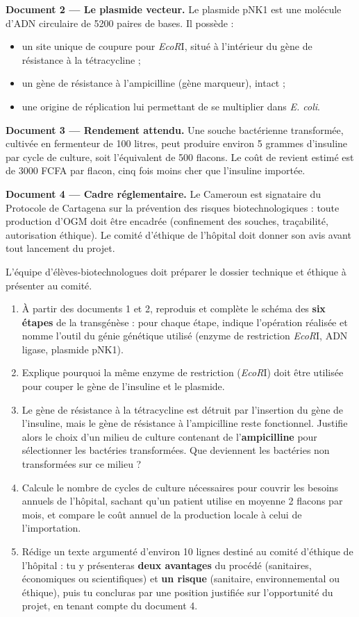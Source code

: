 \documentclass[11pt]{article}
\newcommand{\cle}[1]{{\popxbold\color{popdark}#1}}
\newcounter{popsec}
\newcounter{popsub}
\newcommand{\courssub}[1]{%
  \stepcounter{popsub}%
  \par\vspace{9pt}\noindent{\popxbold\fontsize{11.5}{13}\selectfont\color{popink}{\color{poporange}\thepopsec.\thepopsub}\hspace{6pt}#1}\par\nopagebreak\vspace{4pt}
}
\begin{document}
\textbf{Document 2 — Le plasmide vecteur.} Le plasmide pNK1 est une molécule d'ADN circulaire de 5200 paires de bases. Il possède :
\begin{itemize}
\item un \cle{site unique} de coupure pour \emph{EcoR}I, situé à l'intérieur du gène de résistance à la tétracycline ;
\item un gène de résistance à l'ampicilline (gène \cle{marqueur}), intact ;
\item une origine de réplication lui permettant de se multiplier dans \emph{E. coli}.
\end{itemize}

\textbf{Document 3 — Rendement attendu.} Une souche bactérienne transformée, cultivée en fermenteur de 100 litres, peut produire environ 5 grammes d'insuline par cycle de culture, soit l'équivalent de 500 flacons. Le coût de revient estimé est de \num{3000} FCFA par flacon, cinq fois moins cher que l'insuline importée.

\textbf{Document 4 — Cadre réglementaire.} Le Cameroun est signataire du Protocole de Cartagena sur la prévention des risques biotechnologiques : toute production d'OGM doit être encadrée (confinement des souches, traçabilité, autorisation éthique). Le comité d'éthique de l'hôpital doit donner son avis avant tout lancement du projet.

L'équipe d'élèves-biotechnologues doit préparer le dossier technique et éthique à présenter au comité.

\courssub{Consignes}

\begin{enumerate}
\item À partir des documents 1 et 2, reproduis et complète le schéma des \textbf{six étapes} de la transgénèse : pour chaque étape, indique l'opération réalisée et nomme l'outil du génie génétique utilisé (enzyme de restriction \emph{EcoR}I, ADN ligase, plasmide pNK1).
\item Explique pourquoi la même enzyme de restriction (\emph{EcoR}I) doit être utilisée pour couper le gène de l'insuline et le plasmide.
\item Le gène de résistance à la tétracycline est détruit par l'insertion du gène de l'insuline, mais le gène de résistance à l'ampicilline reste fonctionnel. Justifie alors le choix d'un milieu de culture contenant de l'\textbf{ampicilline} pour sélectionner les bactéries transformées. Que deviennent les bactéries non transformées sur ce milieu ?
\item Calcule le nombre de cycles de culture nécessaires pour couvrir les besoins annuels de l'hôpital, sachant qu'un patient utilise en moyenne 2 flacons par mois, et compare le coût annuel de la production locale à celui de l'importation.
\item Rédige un texte argumenté d'environ 10 lignes destiné au comité d'éthique de l'hôpital : tu y présenteras \textbf{deux avantages} du procédé (sanitaires, économiques ou scientifiques) et \textbf{un risque} (sanitaire, environnemental ou éthique), puis tu concluras par une position justifiée sur l'opportunité du projet, en tenant compte du document 4.
\end{enumerate}
\end{document}
